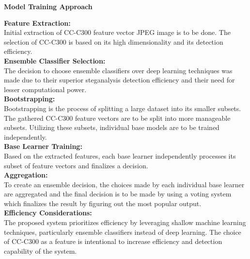 \begin{flushleft}
    \Large{\textbf{Model Training Approach}}\\
\end{flushleft}
\textbf{Feature Extraction:}\\
Initial extraction of CC-C300 feature vector JPEG image is to be done. The selection of CC-C300 is based on its high dimensionality and  its detection efficiency.\vspace{0.25cm}\\
\textbf{Ensemble Classifier Selection:}\\
The decision to choose ensemble classifiers over deep learning techniques was made due to their superior steganalysis detection efficiency and their need for lesser computational power.\vspace{0.25cm}\\
\textbf{Bootstrapping:}\\
Bootstrapping is the process of splitting a large dataset into its smaller subsets. The gathered CC-C300 feature vectors are to be split  into more manageable subsets. Utilizing these subsets, individual base models are to be trained independently.\vspace{0.25cm}\\
\textbf{Base Learner Training:}\\
Based on the extracted features, each base learner independently processes its subset of feature vectors and finalizes a decision.\vspace{0.25cm}\\
\textbf{Aggregation:}\\
To create an ensemble decision, the choices made by each individual base learner are aggregated and the final decision is to be made by using a voting system which finalizes the result by figuring out the most popular output.\vspace{0.25cm}\\
\textbf{Efficiency Considerations:}\\
The proposed system prioritizes efficiency by leveraging shallow machine learning techniques, particularly ensemble classifiers instead of deep learning. The choice of CC-C300 as a feature is intentional to increase efficiency and detection capability of the system.\\
\clearpage 

